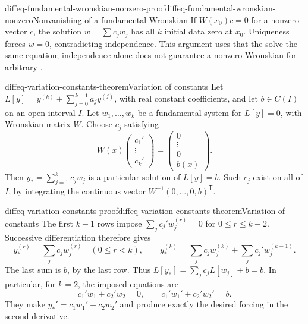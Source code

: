 \documentclass[preview]{standalone}
\begin{document}
\begin{snippetproof}{diffeq-fundamental-wronskian-nonzero-proof}{diffeq-fundamental-wronskian-nonzero}{Nonvanishing of a fundamental Wronskian}
    If \(W(x_0)c=0\) for a nonzero vector \(c\), the solution
    \(w=\sum c_jw_j\) has all \(k\) initial data zero at \(x_0\).
    Uniqueness forces \(w=0\), contradicting independence.
    This argument uses that the \function[functions] solve the same equation;
    independence alone does not guarantee a nonzero Wronskian for arbitrary \function[functions].
\end{snippetproof}

\begin{snippettheorem}{diffeq-variation-constants-theorem}{Variation of constants}
    Let \(L[y]=y^{(k)}+\sum_{j=0}^{k-1}a_jy^{(j)}\), with real constant
    coefficients, and let \(b\in C(I)\) on an open interval \(I\).
    Let \(w_1,\ldots,w_k\) be a fundamental system for \(L[y]=0\),
    with Wronskian matrix \(W\). Choose \function[functions] \(c_j\) satisfying
    \[
        W(x)\begin{pmatrix}c_1'\\ \vdots\\c_k'\end{pmatrix}
        =\begin{pmatrix}0\\ \vdots\\0\\ b(x)\end{pmatrix}.
    \]
    Then \(y_*=\sum_{j=1}^k c_jw_j\) is a particular solution of \(L[y]=b\).
    Such \(c_j\) exist on all of \(I\), by integrating the continuous vector
    \(W^{-1}(0,\ldots,0,b)^{\mathsf T}\).
\end{snippettheorem}

\begin{snippetproof}{diffeq-variation-constants-proof}{diffeq-variation-constants-theorem}{Variation of constants}
    The first \(k-1\) rows impose
    \(\sum_j c_j'w_j^{(r)}=0\) for \(0\leq r\leq k-2\).
    Successive differentiation therefore gives
    \[
        y_*^{(r)}=\sum_j c_jw_j^{(r)}\quad(0\leq r<k),\qquad
        y_*^{(k)}=\sum_j c_jw_j^{(k)}+\sum_j c_j'w_j^{(k-1)}.
    \]
    The last sum is \(b\), by the last row. Thus
    \(L[y_*]=\sum_j c_jL[w_j]+b=b\).
    In particular, for \(k=2\), the imposed equations are
    \[
        c_1'w_1+c_2'w_2=0,\qquad
        c_1'w_1'+c_2'w_2'=b.
    \]
    They make \(y_*'=c_1w_1'+c_2w_2'\) and produce exactly the desired
    forcing in the second derivative.
\end{snippetproof}
\end{document}

